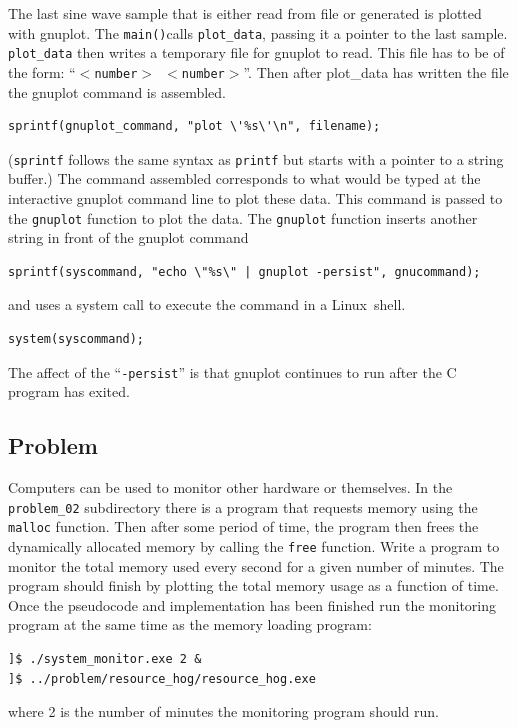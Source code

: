 \documentclass[11pt]{scrartcl}
\def\main{\texttt{main()}}
\def\linux{Linux}
\begin{document}
The last sine wave sample that is either read from file or generated
is plotted with gnuplot.  The \main calls \texttt{plot\_data}, passing
it a pointer to the last sample.   \texttt{plot\_data} then writes a
temporary file for gnuplot to read.  This file has to be of the form:
``\texttt{$<$number$>$ $<$number$>$}''.  Then after plot\_data has
written the file the gnuplot command is assembled.
\begin{lstlisting}
sprintf(gnuplot_command, "plot \'%s\'\n", filename);
\end{lstlisting}
(\texttt{sprintf} follows the same syntax as \texttt{printf} but starts
with a pointer to a string buffer.)  The command assembled corresponds
to what would be typed at the interactive gnuplot command line to plot
these data.  This command is passed to the \texttt{gnuplot} function
to plot the data.  The \texttt{gnuplot} function inserts another
string in front of the gnuplot command
\begin{lstlisting}
sprintf(syscommand, "echo \"%s\" | gnuplot -persist", gnucommand);
\end{lstlisting}
and uses a system call to execute the command in a \linux\ shell.
\begin{lstlisting}
system(syscommand);
\end{lstlisting}
The affect of the ``\texttt{-persist}'' is that gnuplot continues to
run after the C program has exited. 

\clearpage
\newpage

\subsection{Problem}
Computers can be used to monitor other hardware or themselves.  In the \texttt{problem_02} subdirectory there is a program that requests memory using the \texttt{malloc} function.  Then after some period of time, the program then frees the
dynamically allocated memory by calling the \texttt{free} function.  Write a
program to monitor the total memory used every second for a given
number of minutes.  The program should finish by plotting the total
memory usage as a function of time.  Once the pseudocode and
implementation has been finished run the monitoring program at the
same time as the memory loading program:
\begin{verbatim}
]$ ./system_monitor.exe 2 &
]$ ../problem/resource_hog/resource_hog.exe
\end{verbatim}
where 2 is the number of minutes the monitoring program should run.
\end{document}
